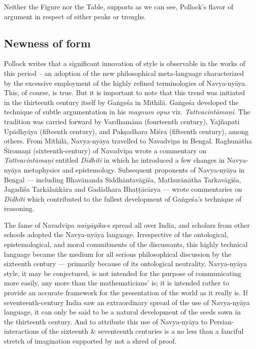 \newpage

Neither the Figure nor the Table, supports as we can see, Pollock’s flavor of argument in respect of either peaks or troughs.



\subsection{Newness of form}%

Pollock writes that a significant innovation of style is observable in the works of this period – an adoption of the new philosophical meta-language characterized by the excessive employment of the highly refined terminologies of Navya-nyāya. This, of course, is true. But it is important to note that this trend was initiated in the thirteenth century itself by Gaṅgeśa in Mithilā. Gaṅgeśa developed the technique of subtle argumentation in his {\sl magnum opus}  viz. {\sl Tattvacintāmaṇi}. The tradition was carried forward by Vardhamāna (fourteenth century), Yajñapati Upādhyāya (fifteenth century), and Pakṣadhara Miśra (fifteenth century), among others. From Mithilā, Navya-nyāya travelled to Navadvīpa in Bengal. Raghunātha Śiromaṇi (sixteenth-century) of Navadvīpa wrote a commentary on {\sl Tattvacintāmaṇi} entitled {\sl Dīdhiti} in which he introduced a few changes in Navya-nyāya metaphysics and epistemology. Subsequent proponents of Navya-nyāya in Bengal — including Bhavānanda Siddhāntavāgīśa, Mathurānātha Tarkavāgīśa, Jagadīśa Tarkālaṅkāra and Gadādhara Bhaṭṭācārya — wrote commentaries on {\sl Dīdhiti} which contributed to the fullest development of Gaṅgeśa’s technique of reasoning. 

The fame of Navadvīpa {\sl naiyāyika}-s spread all over India, and scholars from other schools adopted the Navya-nyāya language.  Irrespective of the ontological, epistemological, and moral commitments of the discussants, this highly technical language became the medium for all serious philosophical discussion by the sixteenth century — primarily because of its ontological neutrality. Navya-nyāya style, it may be conjectured, is not intended for the purpose of communicating more easily, any more than the mathematicians’ is; it is intended rather to provide an accurate framework for the presentation of the world as it really is. If seventeenth-century India saw an extraordinary spread of the use of Navya-nyāya language, it can only be said to be a natural development of the seeds sown in the thirteenth century. And to attribute this use of Navya-nyāya to Persian-interactions of the sixteenth \& seventeenth centuries is a no less than a fanciful stretch of imagination supported by not a shred of proof. 

